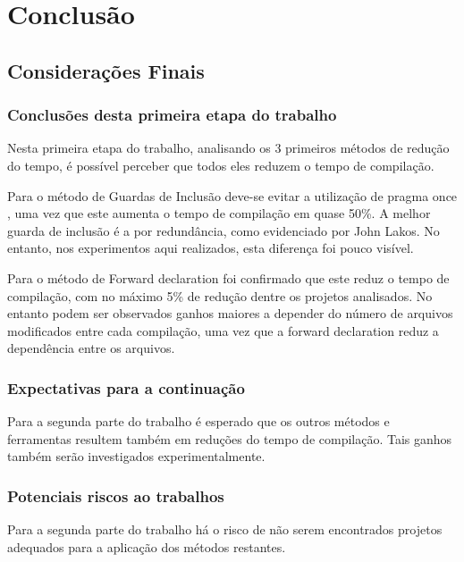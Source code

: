 \part{Conclusão}

\chapter[Considerações Finais]{Considerações Finais}

\section{Conclusões desta primeira etapa do trabalho}

Nesta primeira etapa do trabalho, analisando os 3 primeiros
 métodos de redução do tempo, é possível perceber que todos
 eles reduzem o tempo de compilação.

Para o método de Guardas de Inclusão deve-se evitar a
 utilização de pragma once , uma vez que este aumenta
 o tempo de compilação em quase 50\%. A melhor guarda
 de inclusão é a por redundância, como evidenciado por
 John Lakos. No entanto, nos experimentos aqui realizados,
 esta diferença foi pouco visível.

Para o método de Forward declaration foi confirmado que
 este reduz o tempo de compilação, com no máximo 5\% de redução
 dentre os projetos analisados. No entanto podem ser observados
 ganhos maiores a depender do número de arquivos modificados
 entre cada compilação, uma vez que a forward declaration
 reduz a dependência entre os  arquivos.

\section{Expectativas para a continuação}

Para a segunda parte do trabalho é esperado que os
 outros métodos e ferramentas resultem também em
 reduções do tempo de compilação. Tais ganhos
 também serão investigados experimentalmente.  

\section{Potenciais riscos ao trabalhos}

Para a segunda parte do trabalho há o risco de não 
serem encontrados projetos adequados para a aplicação
 dos métodos restantes.

